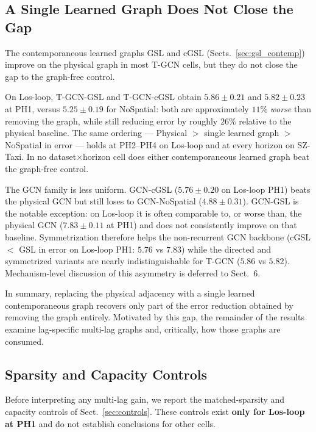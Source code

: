 \subsection{A Single Learned Graph Does Not Close the Gap}\label{sec:res-single}

The contemporaneous learned graphs GSL and cGSL
(Sects.~\ref{sec:gsl_contemp}) improve on the physical graph in most
T-GCN cells, but they do not close the gap to the graph-free control.

On Los-loop, T-GCN-GSL and T-GCN-cGSL obtain $5.86\pm 0.21$ and
$5.82\pm 0.23$ at PH1, versus $5.25\pm 0.19$ for NoSpatial: both are
approximately $11\%$ \emph{worse} than removing the graph, while still
reducing error by roughly $26\%$ relative to the physical baseline. The same
ordering --- Physical $>$ single learned graph $>$ NoSpatial in error ---
holds at PH2--PH4 on Los-loop and at every horizon on SZ-Taxi. In no
dataset$\times$horizon cell does either contemporaneous learned graph beat
the graph-free control.

The GCN family is less uniform. GCN-cGSL ($5.76\pm 0.20$ on Los-loop PH1)
beats the physical GCN but still loses to GCN-NoSpatial ($4.88\pm 0.31$).
GCN-GSL is the notable exception: on Los-loop it is often comparable to, or
worse than, the physical GCN ($7.83\pm 0.11$ at PH1) and does not
consistently improve on that baseline. Symmetrization therefore helps the
non-recurrent GCN backbone (cGSL $<$ GSL in error on Los-loop PH1:
$5.76$ vs $7.83$) while the directed and symmetrized variants are nearly
indistinguishable for T-GCN ($5.86$ vs $5.82$). Mechanism-level discussion
of this asymmetry is deferred to Sect.~6.

In summary, replacing the physical adjacency with a single learned
contemporaneous graph recovers only part of the error reduction obtained by
removing the graph entirely. Motivated by this gap, the remainder of the
results examine lag-specific multi-lag graphs and, critically, how those
graphs are consumed.

\subsection{Sparsity and Capacity Controls}\label{sec:res-controls}

Before interpreting any multi-lag gain, we report the matched-sparsity and
capacity controls of Sect.~\ref{sec:controls}. These controls exist
\textbf{only for Los-loop at PH1} and do not establish conclusions for other
cells.

